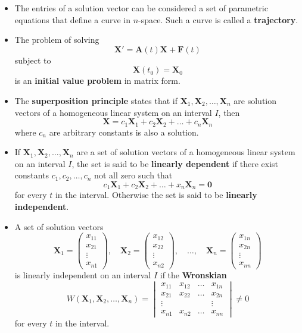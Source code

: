 \documentclass{article}
\begin{document}
\begin{itemize}
  \item The entries of a solution vector can be considered a set of parametric equations that define a curve in $n$-space. Such a curve is called a \textbf{trajectory}.

  \item The problem of solving \[\mathbf{X}' = \mathbf{A}(t) \mathbf{X} + \mathbf{F}(t)\] subject to \[\mathbf{X}(t_0) = \mathbf{X}_0\] is an \textbf{initial value problem} in matrix form.

  \item The \textbf{superposition principle} states that if $\mathbf{X}_1, \mathbf{X}_2, \ldots, \mathbf{X}_n$ are solution vectors of a homogeneous linear system on an interval $I$, then \[\mathbf{X} = c_1 \mathbf{X}_1 + c_2 \mathbf{X}_2 + \ldots + c_n \mathbf{X}_n\] where $c_n$ are arbitrary constants is also a solution.

  \item If $\mathbf{X}_1, \mathbf{X}_2, \ldots, \mathbf{X}_n$ are a set of solution vectors of a homogeneous linear system on an interval $I$, the set is said to be \textbf{linearly dependent} if there exist constants $c_1, c_2, \ldots, c_n$ not all zero such that \[c_1 \mathbf{X}_1 + c_2 \mathbf{X}_2 + \ldots + x_n \mathbf{X}_n = \mathbf{0}\] for every $t$ in the interval. Otherwise the set is said to be \textbf{linearly independent}.

  \item A set of solution vectors \[\mathbf{X}_1 = \begin{pmatrix}
            x_{11} \\
            x_{21} \\
            \vdots \\
            x_{n1}
          \end{pmatrix}, \quad \mathbf{X}_2 = \begin{pmatrix}
            x_{12} \\
            x_{22} \\
            \vdots \\
            x_{n2}
          \end{pmatrix}, \quad \ldots, \quad \mathbf{X}_n = \begin{pmatrix}
            x_{1n} \\
            x_{2n} \\
            \vdots \\
            x_{nn}
          \end{pmatrix}\] is linearly independent on an interval $I$ if the \textbf{Wronskian} \[W(\mathbf{X}_1, \mathbf{X}_2, \ldots, \mathbf{X}_n) = \begin{vmatrix}
            x_{11} & x_{12} & \ldots & x_{1n} \\
            x_{21} & x_{22} & \ldots & x_{2n} \\
            \vdots &        &        & \vdots \\
            x_{n1} & x_{n2} & \ldots & x_{nn}
          \end{vmatrix} \ne 0\] for every $t$ in the interval.


\end{itemize}
\end{document}
